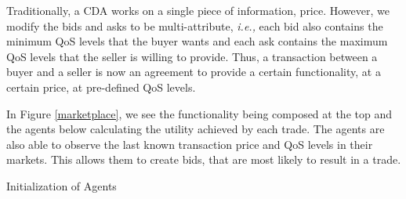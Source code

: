 \documentclass[10pt,journal,compsoc]{IEEEtran}
\begin{document}

Traditionally, a CDA works on a single piece of information, price. However, we modify the bids and asks to be multi-attribute, \textit{i.e.,} each bid also contains the minimum QoS levels that the buyer wants and each ask contains the maximum QoS levels that the seller is willing to provide. Thus, a transaction between a buyer and a seller is now an agreement to provide a certain functionality, at a certain price, at pre-defined QoS levels.

In Figure \ref{marketplace}, we see the functionality being composed at the top and the agents below calculating the utility achieved by each trade. The agents are also able to observe the last known transaction price and QoS levels in their markets. This allows them to create bids, that are most likely to result in a trade.

\begin{algorithm}
 \DontPrintSemicolon
 \caption{Initialization of Agents}
 \label{Initialization}
\end{algorithm}
\end{document}
